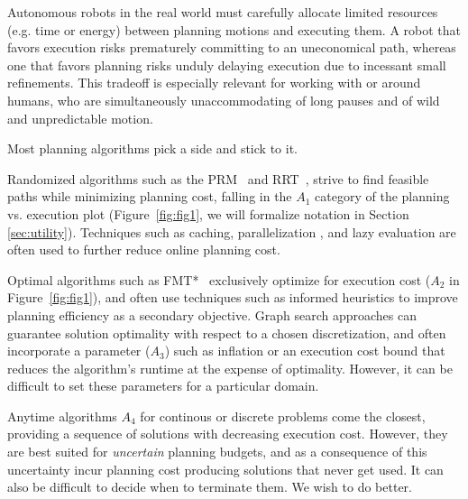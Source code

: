 
Autonomous robots in the real world
must carefully allocate limited resources (e.g. time or energy)
between planning motions and executing them.
A robot that favors execution
risks prematurely committing to an uneconomical path, whereas
one that favors planning risks unduly delaying execution 
due to incessant small refinements.
This tradeoff is especially relevant for working with
or around humans, who are simultaneously 
unaccommodating of long pauses
and of wild and unpredictable motion.

Most planning algorithms pick a side and stick to it.

Randomized algorithms such as the
PRM~\citep{kavrakietal1996prm}
and RRT~\citep{lavallekuffner1999rrt},
strive to find feasible paths while minimizing planning cost,
falling in the $A_1$ category of the planning vs. execution
plot (Figure~\ref{fig:fig1}, we will formalize notation 
in Section \ref{sec:utility}).
Techniques such as caching, parallelization \citep{ichnowski2012prrt},
and lazy evaluation \citep{bohlin2000lazyprm}
are often used to further reduce online planning cost.

Optimal algorithms
such as FMT*~\citep{janson2015fmtstar}
exclusively optimize for execution
cost ($A_2$ in Figure~\ref{fig:fig1}), 
and often use techniques such as informed heuristics to improve
planning efficiency as a secondary objective.
Graph search approaches \citep{hart1968astar}
can guarantee solution optimality
with respect to a chosen discretization,
and often incorporate a parameter ($A_3$) such as inflation
\citep{pohl1970weightedastar}
or an execution cost bound \citep{stern2014}
that reduces the algorithm's runtime at the expense of optimality.
However,
it can be difficult to set these parameters for a particular domain.

Anytime algorithms $A_4$
for continous
\citep{karaman2011samplingoptimal, gammell2015bitstar, hauser2015lazy}
or discrete
\citep{likhachev2004arastar} problems
come the closest, providing a sequence of solutions
with decreasing execution cost.
However, they are best suited for \emph{uncertain}
planning budgets, and as a consequence of this uncertainty
incur planning cost producing
solutions that never get used.
It can also be difficult to decide when to terminate them.
We wish to do better.

